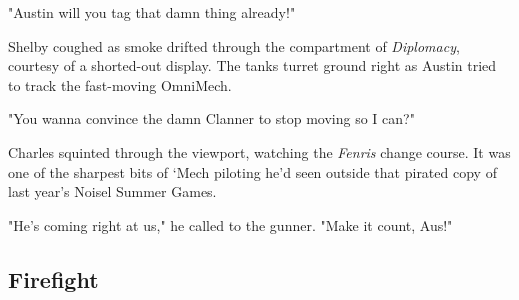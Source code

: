 "Austin will you tag that damn thing already!"

Shelby coughed as smoke drifted through the compartment of \emph{Diplomacy}, courtesy of a shorted-out display.
The tanks turret ground right as Austin tried to track the fast-moving OmniMech.

"You wanna convince the damn Clanner to stop moving so I can?"

Charles squinted through the viewport, watching the \emph{Fenris} change course.
It was one of the sharpest bits of ‘Mech piloting he'd seen outside that pirated copy of last year's Noisel Summer Games.

"He's coming right at us," he called to the gunner. "Make it count, Aus!"


\newpage

\subsection{Firefight}

